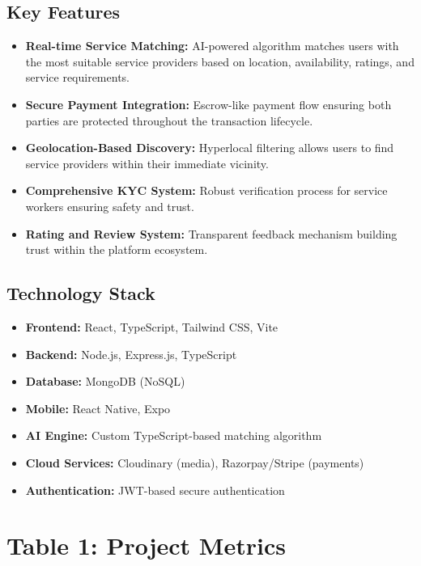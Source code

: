 \documentclass[12pt,a4paper]{article}
\begin{document}
\subsection*{Key Features}
\begin{itemize}[leftmargin=*]
    \item \textbf{Real-time Service Matching:} AI-powered algorithm matches users with the most suitable service providers based on location, availability, ratings, and service requirements.
    \item \textbf{Secure Payment Integration:} Escrow-like payment flow ensuring both parties are protected throughout the transaction lifecycle.
    \item \textbf{Geolocation-Based Discovery:} Hyperlocal filtering allows users to find service providers within their immediate vicinity.
    \item \textbf{Comprehensive KYC System:} Robust verification process for service workers ensuring safety and trust.
    \item \textbf{Rating and Review System:} Transparent feedback mechanism building trust within the platform ecosystem.
\end{itemize}

\subsection*{Technology Stack}
\begin{itemize}[leftmargin=*]
    \item \textbf{Frontend:} React, TypeScript, Tailwind CSS, Vite
    \item \textbf{Backend:} Node.js, Express.js, TypeScript
    \item \textbf{Database:} MongoDB (NoSQL)
    \item \textbf{Mobile:} React Native, Expo
    \item \textbf{AI Engine:} Custom TypeScript-based matching algorithm
    \item \textbf{Cloud Services:} Cloudinary (media), Razorpay/Stripe (payments)
    \item \textbf{Authentication:} JWT-based secure authentication
\end{itemize}

\newpage

\section*{Table 1: Project Metrics}
\end{document}
